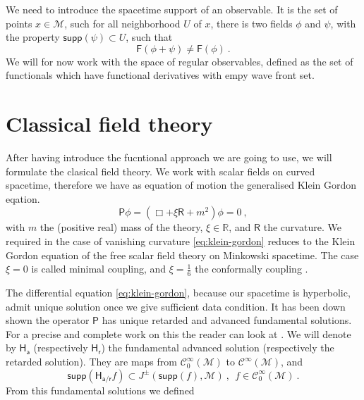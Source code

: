 \documentclass[11pt]{book}
\newcommand{\supp}{\mathsf{supp}}
\newcommand{\Ccal}{\mathcal{C}}
\newcommand{\Mcal}{\mathcal{M}}
\newcommand{\Rbb}{\mathbb{R}}
\newcommand{\Fsf}{\mathsf{F}}
\newcommand{\Hsf}{\mathsf{H}}
\newcommand{\Psf}{\mathsf{P}}
\newcommand{\Rsf}{\mathsf{R}}
\newcommand{\asf}{\mathsf{a}}
\newcommand{\rsf}{\mathsf{r}}
\begin{document}
We need to introduce the spacetime support of an observable. It is the set of points $x \in \Mcal$, such for all neighborhood $U$ of $x$, there is two fields $\phi$ and $\psi$, with the property $\supp\left(\psi\right) \subset U$, such that%
%
\begin{equation*}
\Fsf(\phi+\psi) \neq \Fsf(\phi) \ . 
\end{equation*}
%
We will for now work with the space of regular observables, defined as the set of functionals which have functional derivatives with empy wave front set.\par%


\section{Classical field theory}

After having introduce the fucntional approach we are going to use, we will formulate the clasical field theory. We work with scalar fields on curved spacetime, therefore we have as equation of motion the generalised Klein Gordon eqation.%
%
\begin{equation}
\Psf \phi = \left( \Box + \xi \Rsf + m^2 \right) \phi = 0 \ , 
\label{eq:klein-gordon}
\end{equation}
%
with $m$ the (positive real) mass of the theory, $\xi \in \Rbb$, and $\Rsf$ the curvature. We required in the case of vanishing curvature \eqref{eq:klein-gordon} reduces to the Klein Gordon equation of the free scalar field theory on Minkowski spacetime. The case $\xi=0$ is called minimal coupling, and $\xi=\frac16$ the conformally coupling \cite[Appendix D]{waldGR}.\par%


The differential equation \eqref{eq:klein-gordon}, because our spacetime is hyperbolic, admit unique solution once we give sufficient data condition. It has been down shown the operator $\Psf$ has unique retarded and advanced fundamental solutions. For a precise and complete work on this the reader can look at \cite[section 3]{Bar:2007zz}. We will denote by $\Hsf_\asf$ (respectively $\Hsf_\rsf$) the fundamental advanced solution (respectively the retarded solution). They are maps from $\Ccal^\infty_0(\Mcal)$ to $\Ccal^\infty(\Mcal)$, and%
%
\begin{equation*}
\supp\left( \Hsf_{\asf/\rsf} f \right) \subset J^{\pm}\left(\supp\left(f\right),\Mcal\right) \ , \ \ f \in \Ccal^\infty_0(\Mcal) \ . 
\end{equation*}
%
From this fundamental solutions we defined 
\end{document}
